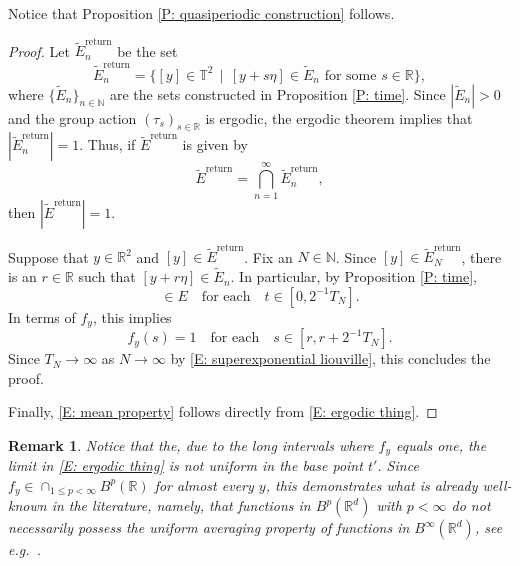 \documentclass[12pt]{amsart}
\newtheorem{remark}{Remark}
\begin{document}
Notice that Proposition \ref{P: quasiperiodic construction} follows.
		
			\begin{proof} Let $\tilde{E}^{\text{return}}_{n}$ be the set
				\begin{equation*}
					\tilde{E}^{\text{return}}_{n} = \{[y] \in \mathbb{T}^{2} \, \mid \, [y + s \eta] \in \tilde{E}_{n} \, \, \text{for some} \, \, s \in \mathbb{R}\},
				\end{equation*}
			where $\{\tilde{E}_{n}\}_{n \in \mathbb{N}}$ are the sets constructed in Proposition \ref{P: time}.  Since $|\tilde{E}_{n}| > 0$ and the group action $(\tau_{s})_{s \in \mathbb{R}}$ is ergodic, the ergodic theorem implies that $|\tilde{E}^{\text{return}}_{n}| = 1$. Thus, if $\tilde{E}^{\text{return}}$ is given by
				\begin{equation*}
					\tilde{E}^{\text{return}} = \bigcap_{n = 1}^{\infty} \tilde{E}^{\text{return}}_{n},
				\end{equation*}
			then $|\tilde{E}^{\text{return}}| = 1$. 
			
			Suppose that $y \in \mathbb{R}^{2}$ and $[y] \in \tilde{E}^{\text{return}}$. Fix an $N \in \mathbb{N}$. Since $[y] \in \tilde{E}^{\text{return}}_{N}$, there is an $r \in \mathbb{R}$ such that $[y + r \eta] \in \tilde{E}_{n}$. In particular, by Proposition \ref{P: time},
				\begin{equation*}
					[y + (r + t) \eta] \in E \quad \text{for each} \quad t \in [0,2^{-1}T_{N}].
				\end{equation*}
			In terms of $f_{y}$, this implies
				\begin{equation*}
					f_{y}(s) = 1 \quad \text{for each} \quad s \in [r, r + 2^{-1}T_{N}].
				\end{equation*}
			Since $T_{N} \to \infty$ as $N \to \infty$ by \eqref{E: superexponential liouville}, this concludes the proof. 
			
		Finally, \eqref{E: mean property} follows directly from \eqref{E: ergodic thing}. \end{proof}
			
		\begin{remark} \label{R: no uniformity} Notice that the, due to the long intervals where $f_{y}$ equals one, the limit in \eqref{E: ergodic thing} is \emph{not} uniform in the base point $t'$. Since $f_{y} \in \cap_{1 \leq p < \infty} B^{p}(\mathbb{R})$ for almost every $y$, this demonstrates what is already well-known in the literature, namely, that functions in $B^{p}(\mathbb{R}^{d})$ with $p < \infty$ do not necessarily possess the uniform averaging property of functions in $B^{\infty}(\mathbb{R}^{d})$, see e.g.~\cite[(13)]{part1}. \end{remark}
		
\end{document}

